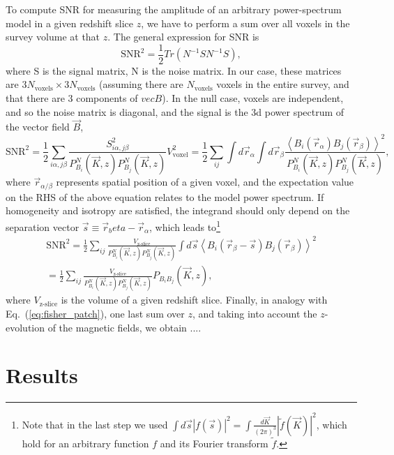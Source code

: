 \documentclass[12pt]{paper}
\newcommand{\beq}{\begin{equation}}
\newcommand{\eeq}{\end{equation}}
\newcommand{\bga}{\begin{gathered}}
\newcommand{\ega}{\end{gathered}}
\begin{document}
To compute SNR for measuring the amplitude of an arbitrary power-spectrum model in a given redshift slice $z$, we have to perform a sum over all voxels in the survey volume at that $z$. The general expression for SNR is
\beq
\text{SNR}^2 = \frac{1}{2} Tr \left( N^{-1}SN^{-1}S\right),
\label{eq:snr_general}
\eeq
where S is the signal matrix, N is the noise matrix. In our case, these matrices are $3N_\text{voxels}\times 3N_\text{voxels}$ (assuming there are $N_\text{voxels}$ voxels in the entire survey, and that there are 3 components of $vec B$). In the null case, voxels are independent, and so the noise matrix is diagonal, and the signal is the 3d power spectrum of the vector field $\vec B$, 
\beq
\text{SNR}^2 = \frac{1}{2} \sum_{i\alpha, j\beta} \frac{S_{i\alpha , j\beta}^2}{P^N_{B_i}(\vec K, z)P^N_{B_j}(\vec K, z)} V_\text{voxel}^2=
\frac{1}{2} \sum_{ij} \int d\vec r_\alpha \int d\vec r_\beta \frac{\left< B_i(\vec r_\alpha) B_j(\vec r_\beta)\right>^2}{P^N_{B_i}(\vec K, z)P^N_{B_j}(\vec K, z)},
\label{eq:snr_z_step1}
\eeq
where $\vec r_{\alpha/\beta}$ represents spatial position of a given voxel, and the expectation value on the RHS of the above equation relates to the model power spectrum. If homogeneity and isotropy are satisfied, the integrand should only depend on the separation vector $\vec s \equiv \vec r_beta -\vec r_\alpha$, which leads to\footnote{Note that in the last step we used $\int d\vec s |f(\vec s)|^2 = \int \frac{d\vec K}{(2\pi)^3}|\widetilde f(\vec K)|^2$, which hold for an arbitrary function $f$ and its Fourier transform $\widetilde f$.}
\beq
\bga
\text{SNR}^2 = 
\frac{1}{2} \sum_{ij}  \frac{V_\text{z-slice}}{{P^N_{B_i}(\vec K, z)P^N_{B_j}(\vec K, z)}}\int d\vec s \left< B_i(\vec r_\beta - \vec s) B_j(\vec r_\beta)\right>^2\\
=
\frac{1}{2} \sum_{ij}  \frac{V_\text{z-slice}}{{P^N_{B_i}(\vec K, z)P^N_{B_j}(\vec K, z)}} P_{B_iB_j}(\vec K,z),
\ega
\label{eq:snr_z}
\eeq
where $V_\text{z-slice}$ is the volume of a given redshift slice. Finally, in analogy with Eq.~(\ref{eq:fisher_patch}), one last sum over $z$, and taking into account the $z$-evolution of the magnetic fields, we obtain ....
\section{Results}
\label{sec:results}
\end{document}
